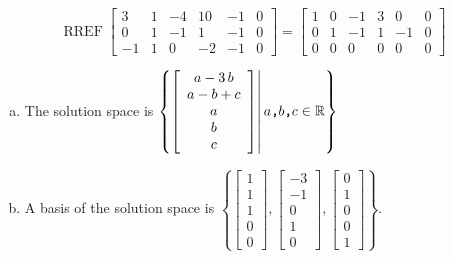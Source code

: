 \begin{exerciseAnswer} 


\[\operatorname{RREF} \left[\begin{array}{ccccc|c}
3 & 1 & -4 & 10 & -1 & 0 \\
0 & 1 & -1 & 1 & -1 & 0 \\
-1 & 1 & 0 & -2 & -1 & 0
\end{array}\right] = \left[\begin{array}{ccccc|c}
1 & 0 & -1 & 3 & 0 & 0 \\
0 & 1 & -1 & 1 & -1 & 0 \\
0 & 0 & 0 & 0 & 0 & 0
\end{array}\right] \]


\begin{enumerate}[(a)]
\item The solution space is \( \left\{ \left[\begin{array}{c}
a - 3 \, b \\
a - b + c \\
a \\
b \\
c
\end{array}\right] \middle|\,a\text{\texttt{,}}b\text{\texttt{,}}c\in\mathbb{R}\right\} \)
\item A basis of the solution space is \( \left\{ \left[\begin{array}{c}
1 \\
1 \\
1 \\
0 \\
0
\end{array}\right] , \left[\begin{array}{c}
-3 \\
-1 \\
0 \\
1 \\
0
\end{array}\right] , \left[\begin{array}{c}
0 \\
1 \\
0 \\
0 \\
1
\end{array}\right] \right\} \).
\end{enumerate}
    
\end{exerciseAnswer}
    
